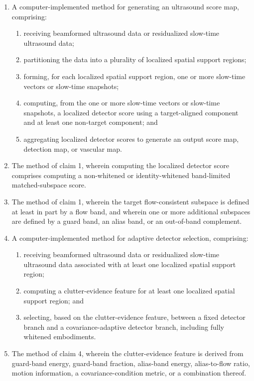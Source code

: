 \documentclass[11pt]{article}
\begin{document}
\begin{enumerate}
\item A computer-implemented method for generating an ultrasound score map, comprising:
\begin{enumerate}[label=\alph*)]
\item receiving beamformed ultrasound data or residualized slow-time ultrasound data;
\item partitioning the data into a plurality of localized spatial support regions;
\item forming, for each localized spatial support region, one or more slow-time vectors or slow-time snapshots;
\item computing, from the one or more slow-time vectors or slow-time snapshots, a localized detector score using a target-aligned component and at least one non-target component; and
\item aggregating localized detector scores to generate an output score map, detection map, or vascular map.
\end{enumerate}

\item The method of claim 1, wherein computing the localized detector score comprises computing a non-whitened or identity-whitened band-limited matched-subspace score.

\item The method of claim 1, wherein the target flow-consistent subspace is defined at least in part by a flow band, and wherein one or more additional subspaces are defined by a guard band, an alias band, or an out-of-band complement.

\item A computer-implemented method for adaptive detector selection, comprising:
\begin{enumerate}[label=\alph*)]
\item receiving beamformed ultrasound data or residualized slow-time ultrasound data associated with at least one localized spatial support region;
\item computing a clutter-evidence feature for at least one localized spatial support region; and
\item selecting, based on the clutter-evidence feature, between a fixed detector branch and a covariance-adaptive detector branch, including fully whitened embodiments.
\end{enumerate}

\item The method of claim 4, wherein the clutter-evidence feature is derived from guard-band energy, guard-band fraction, alias-band energy, alias-to-flow ratio, motion information, a covariance-condition metric, or a combination thereof.


\end{enumerate}
\end{document}
